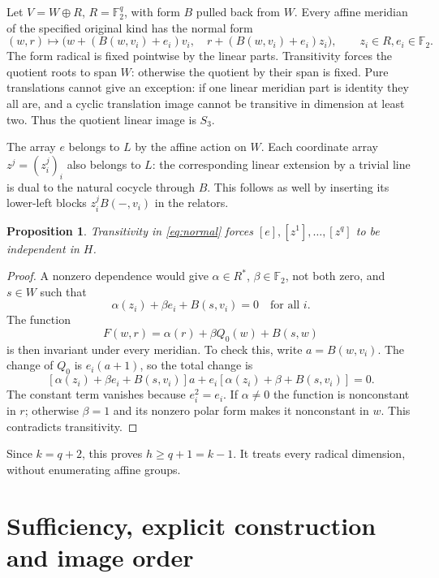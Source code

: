 \documentclass[11pt]{article}
\newtheorem{proposition}[theorem]{Proposition}
\newcommand{\F}{\mathbb F}
\begin{document}
Let $V=W\oplus R$, $R=\F_2^q$, with form $B$ pulled back from
$W$. Every affine meridian of the specified original kind has
the normal form
\begin{equation}\label{eq:normal}
 (w,r)\longmapsto
 \bigl(w+(B(w,v_i)+e_i)v_i,\quad
       r+(B(w,v_i)+e_i)z_i\bigr),
 \qquad z_i\in R, e_i\in\F_2.
\end{equation}
The form radical is fixed pointwise by the linear parts.
Transitivity forces the quotient roots to span $W$: otherwise
the quotient by their span is fixed. Pure translations cannot
give an exception: if one linear meridian part is identity they
all are, and a cyclic translation image cannot be transitive
in dimension at least two. Thus the quotient linear image is
$S_3$.

The array $e$ belongs to $L$ by the affine action on $W$.
Each coordinate array $z^j=(z_i^j)_i$ also belongs to $L$:
the corresponding linear extension by a trivial line is dual
to the natural cocycle through $B$. This follows as well by
inserting its lower-left blocks $z_i^j B(-,v_i)$ in the relators.

\begin{proposition}\label{prop:independence}
Transitivity in \eqref{eq:normal} forces
$[e],[z^1],\ldots,[z^q]$ to be independent in $H$.
\end{proposition}
\begin{proof}
A nonzero dependence would give $\alpha\in R^*$,
$\beta\in\F_2$, not both zero, and $s\in W$ such that
\[
          \alpha(z_i)+\beta e_i+B(s,v_i)=0\quad\text{for all }i.
\]
The function
\[
             F(w,r)=\alpha(r)+\beta Q_0(w)+B(s,w)
\]
is then invariant under every meridian. To check this, write
$a=B(w,v_i)$. The change of $Q_0$ is $e_i(a+1)$, so the total
change is
\[
 [\alpha(z_i)+\beta e_i+B(s,v_i)]a
       +e_i[\alpha(z_i)+\beta+B(s,v_i)]=0.
\]
The constant term vanishes because $e_i^2=e_i$.
If $\alpha\ne0$ the function is nonconstant in $r$; otherwise
$\beta=1$ and its nonzero polar form makes it nonconstant in
$w$. This contradicts transitivity.
\end{proof}

Since $k=q+2$, this proves $h\ge q+1=k-1$. It treats every
radical dimension, without enumerating affine groups.

\section{Sufficiency, explicit construction and image order}
\end{document}
